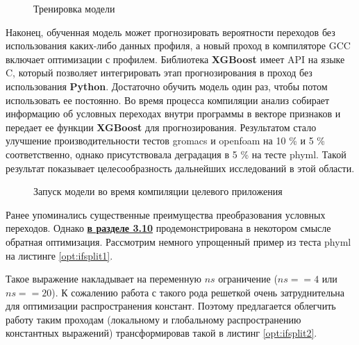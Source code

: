   \begin{figure}[htbp]
  	\centering
  	
  	\caption{Тренировка модели}
  	\label{op:mlpgo2}
  \end{figure}
  Наконец, обученная модель может прогнозировать вероятности  переходов  без использования каких-либо данных профиля, а новый проход в компиляторе GCC включает оптимизации с профилем. Библиотека \textbf{XGBoost} имеет API на языке C, который позволяет интегрировать этап прогнозирования в проход без использования \textbf{Python}. Достаточно обучить модель один раз, чтобы потом использовать ее постоянно. Во время процесса компиляции  анализ собирает информацию об условных переходах  внутри программы в векторе признаков и передает ее функции \textbf{XGBoost} для прогнозирования. Результатом стало улучшение производительности тестов gromacs и openfoam на 10 \% и 5 \%  соответственно, однако присутствовала деградация в 5 \% на тесте phyml. Такой результат показывает целесообразность дальнейших исследований в этой области.
  \begin{figure}[htbp]
  	\centering
  	
  	\caption{Запуск модели во время компиляции целевого приложения}
  	\label{op:mlpgo3}
  \end{figure}
 	
  
  Ранее упоминались существенные преимущества преобразования условных переходов. Однако \underline{\textbf{в разделе 3.10}} продемонстрирована в некотором смысле обратная оптимизация. Рассмотрим немного упрощенный пример из теста phyml на листинге \ref{opt:ifsplit1}.
  
   Такое выражение накладывает на переменную $ns$ ограничение ($ns==4$ или $ns==20$). К сожалению работа с такого рода решеткой очень затруднительна для оптимизации распространения констант. Поэтому предлагается облегчить работу таким проходам (локальному и глобальному  распространению константных выражений) трансформировав такой в листинг \ref{opt:ifsplit2}.
  
